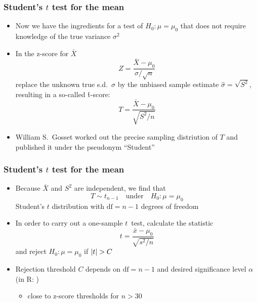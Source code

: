 \documentclass[t]{beamer} %
\begin{document}
\begin{frame}
  \frametitle{Student's $t$ test for the mean}

  \begin{itemize}
  \item Now we have the ingredients for a test of $H_0: \mu = \mu_0$ that does
    not require knowledge of the true variance $\sigma^2$
  \item In the z-score for $\bar{X}$
    \[
    Z = \frac{\bar{X} - \mu_0}{\sigma / \sqrt{n}}
    \]
    replace the unknown true s.d.\ $\sigma$ by the unbiased sample estimate
    $\hat{\sigma} = \sqrt{S^2}$, resulting in a so-called \h{t-score}:
    \[    
    T = \frac{\bar{X} - \mu_0}{\sqrt{S^2 / n}}
    \]
  \item William S.\ Gosset worked out the precise sampling distriution of
    $T$ and published it under the pseudonym ``Student''
  \end{itemize}
\end{frame}  

\begin{frame}
  \frametitle{Student's $t$ test for the mean}

  \begin{itemize}
  \item Because $\bar{X}$ and $S^2$ are independent, we find that
    \[
    T \sim t_{n-1} \quad\text{under}\quad H_0: \mu = \mu_0
    \]
    Student's \h{$t$ distribution} with $\text{df} = n-1$ degrees of freedom
  \item<2-> In order to carry out a one-sample $t$~test, calculate the statistic
    \[
    t = \frac{\bar{x} - \mu_0}{\sqrt{s^2 / n}}    
    \]
    and reject $H_0: \mu=\mu_0$ if $\lvert t\rvert > C$
  \item<3-> Rejection threshold $C$ depends on $\text{df} = n-1$ and desired
    significance level $\alpha$ (in R: )
    \begin{itemize}
    \item[\hand] close to z-score thresholds for $n > 30$
    \end{itemize}
  \end{itemize}
\end{frame}
\end{document}
